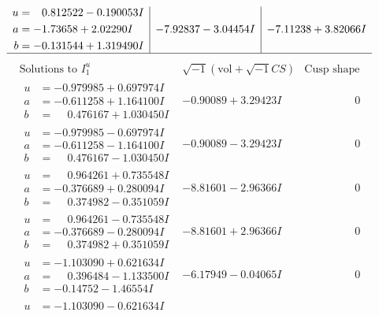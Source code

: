 \documentclass[1p]{elsarticle_modified}
\theoremstyle{definition}
\newcommand{\I}{\sqrt{-1}}
\begin{document}
$$\begin{array}{c|c|c}
\begin{aligned}
u &= \phantom{-}0.812522 - 0.190053 I \\
a &= -1.73658 + 2.02290 I \\
b &= -0.131544 + 1.319490 I\end{aligned}
 & -7.92837 - 3.04454 I & -7.11238 + 3.82066 I\\
 \hline 
 \end{array}$$\newpage$$\begin{array}{c|c|c}  
\text{Solutions to }I^u_{1}& \I (\text{vol} + \sqrt{-1}CS) & \text{Cusp shape}\\
 \hline 
\begin{aligned}
u &= -0.979985 + 0.697974 I \\
a &= -0.611258 + 1.164100 I \\
b &= \phantom{-}0.476167 + 1.030450 I\end{aligned}
 & -0.90089 + 3.29423 I & \phantom{-0.000000 } 0 \\ \hline\begin{aligned}
u &= -0.979985 - 0.697974 I \\
a &= -0.611258 - 1.164100 I \\
b &= \phantom{-}0.476167 - 1.030450 I\end{aligned}
 & -0.90089 - 3.29423 I & \phantom{-0.000000 } 0 \\ \hline\begin{aligned}
u &= \phantom{-}0.964261 + 0.735548 I \\
a &= -0.376689 + 0.280094 I \\
b &= \phantom{-}0.374982 - 0.351059 I\end{aligned}
 & -8.81601 - 2.96366 I & \phantom{-0.000000 } 0 \\ \hline\begin{aligned}
u &= \phantom{-}0.964261 - 0.735548 I \\
a &= -0.376689 - 0.280094 I \\
b &= \phantom{-}0.374982 + 0.351059 I\end{aligned}
 & -8.81601 + 2.96366 I & \phantom{-0.000000 } 0 \\ \hline\begin{aligned}
u &= -1.103090 + 0.621634 I \\
a &= \phantom{-}0.396484 - 1.133500 I \\
b &= -0.14752 - 1.46554 I\end{aligned}
 & -6.17949 - 0.04065 I & \phantom{-0.000000 } 0 \\ \hline\begin{aligned}
u &= -1.103090 - 0.621634 I \\

\end{aligned}
\end{array}$$
\end{document}
